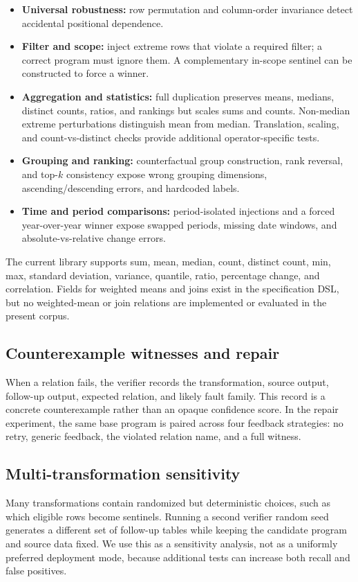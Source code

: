 \documentclass{article}
\begin{document}
\begin{itemize}[leftmargin=*,itemsep=1pt,topsep=2pt]
  \item \textbf{Universal robustness:} row permutation and column-order invariance detect accidental positional dependence.
  \item \textbf{Filter and scope:} inject extreme rows that violate a required filter; a correct program must ignore them. A complementary in-scope sentinel can be constructed to force a winner.
  \item \textbf{Aggregation and statistics:} full duplication preserves means, medians, distinct counts, ratios, and rankings but scales sums and counts. Non-median extreme perturbations distinguish mean from median. Translation, scaling, and count-vs-distinct checks provide additional operator-specific tests.
  \item \textbf{Grouping and ranking:} counterfactual group construction, rank reversal, and top-$k$ consistency expose wrong grouping dimensions, ascending/descending errors, and hardcoded labels.
  \item \textbf{Time and period comparisons:} period-isolated injections and a forced year-over-year winner expose swapped periods, missing date windows, and absolute-vs-relative change errors.
\end{itemize}

The current library supports sum, mean, median, count, distinct count, min, max, standard deviation, variance, quantile, ratio, percentage change, and correlation. Fields for weighted means and joins exist in the specification DSL, but no weighted-mean or join relations are implemented or evaluated in the present corpus.

\subsection{Counterexample witnesses and repair}
When a relation fails, the verifier records the transformation, source output, follow-up output, expected relation, and likely fault family. This record is a concrete counterexample rather than an opaque confidence score. In the repair experiment, the same base program is paired across four feedback strategies: no retry, generic feedback, the violated relation name, and a full witness.

\subsection{Multi-transformation sensitivity}
Many transformations contain randomized but deterministic choices, such as which eligible rows become sentinels. Running a second verifier random seed generates a different set of follow-up tables while keeping the candidate program and source data fixed. We use this as a sensitivity analysis, not as a uniformly preferred deployment mode, because additional tests can increase both recall and false positives.
\end{document}
